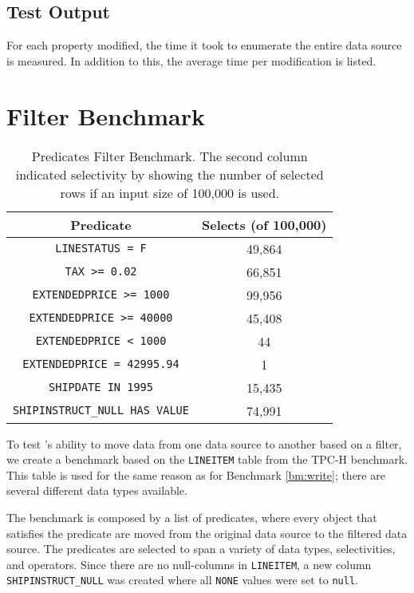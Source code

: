 \subsection{Test Output}
\label{sub:Test Output}
For each property modified, the time it took to enumerate the entire data source is measured. In addition to this, the average time per modification is listed.

\section{Filter Benchmark}
\label{bm:filter}
\begin{table}
    \centering
    \begin{tabular}{c | c}
        Predicate & Selects (of 100,000) \\
        \hline
        \hline
        \texttt{LINESTATUS = F} & 49,864 \\
        \texttt{TAX >= 0.02} & 66,851 \\
        \texttt{EXTENDEDPRICE >= 1000} & 99,956 \\
        \texttt{EXTENDEDPRICE >= 40000} & 45,408\\
        \texttt{EXTENDEDPRICE < 1000} & 44 \\
        \texttt{EXTENDEDPRICE = 42995.94} & 1 \\
        \texttt{SHIPDATE IN 1995} & 15,435 \\
        \texttt{SHIPINSTRUCT\_NULL HAS VALUE} & 74,991 \\
    \end{tabular}
    \caption{Predicates Filter Benchmark. The second column indicated selectivity by showing the number of selected rows if an input size of 100,000 is used.}
    \label{tab:Filter Test}
\end{table}
To test \gap's ability to move data from one data source to another based on a filter, we create a benchmark based on the \texttt{LINEITEM} table from the TPC-H benchmark. This table is used for the same reason as for Benchmark \ref{bm:write}; there are several different data types available. 

The benchmark is composed by a list of predicates, where every object that satisfies the predicate are moved from the original data source to the filtered data source. The predicates are selected to span a variety of data types, selectivities, and operators. Since there are no null-columns in \texttt{LINEITEM}, a new column \texttt{SHIPINSTRUCT\_NULL} was created where all \texttt{NONE} values were set to \texttt{null}.

